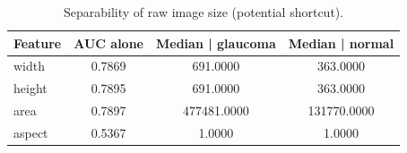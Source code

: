 \begin{table}[t]
\centering
\caption{Separability of raw image size (potential shortcut).}
\label{tab:size}
\begin{tabular}{lccc}
\toprule
Feature & AUC alone & Median | glaucoma & Median | normal \\
\midrule
width & 0.7869 & 691.0000 & 363.0000 \\
height & 0.7895 & 691.0000 & 363.0000 \\
area & 0.7897 & 477481.0000 & 131770.0000 \\
aspect & 0.5367 & 1.0000 & 1.0000 \\
\bottomrule
\end{tabular}
\end{table}